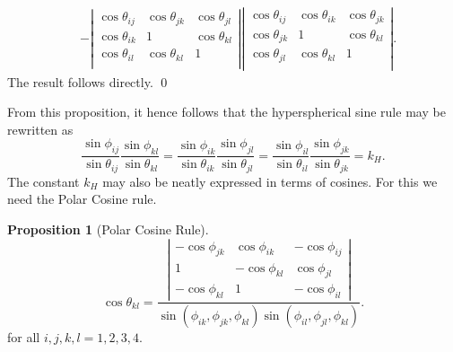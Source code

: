 \documentclass[fleqn,11pt,twoside]{article}
\makeatletter
\renewenvironment{proof}[1][\proofname]{\par
  \normalfont
  \topsep6\p@\@plus6\p@ \trivlist
  \item[\hskip\labelsep\textbf{%
    #1\@addpunct{.}}]\ignorespaces
}{%
  \qed\endtrivlist
}
\theoremstyle{definition}
\newtheorem{prop}{Proposition}
\makeatother
\begin{document}
\begin{proof}
\begin{equation}
\begin{split}
&-\left|\begin{array}{ccc}
\cos\theta_{ij} &  \cos\theta_{jk} & \cos\theta_{jl}\\
\cos\theta_{ik}  & 1 & \cos\theta_{kl}\\
\cos\theta_{il}  & \cos\theta_{kl} & 1\\
\end{array}\right|\left|\begin{array}{ccc}
\cos\theta_{ij} & \cos\theta_{ik} & \cos\theta_{jk}\\
\cos\theta_{jk} & 1 & \cos\theta_{kl}\\
\cos\theta_{jl} & \cos\theta_{kl} & 1\\
\end{array}\right|.
\end{split}
\end{equation}
The result follows directly. 
\end{proof}

From this proposition, it hence follows that the hyperspherical sine rule may be rewritten as 
\begin{equation}
\frac{\sin\phi_{ij}}{\sin\theta_{ij}}\frac{\sin\phi_{kl}}{\sin\theta_{kl}}
=\frac{\sin\phi_{ik}}{\sin\theta_{ik}}\frac{\sin\phi_{jl}}{\sin\theta_{jl}}
=\frac{\sin\phi_{il}}{\sin\theta_{il}}\frac{\sin\phi_{jk}}{\sin\theta_{jk}}
=k_H.
\end{equation}
The constant $k_H$ may also be neatly expressed in terms of cosines.\cite{Derevnin} For this we need the Polar Cosine rule.

\begin{prop}[Polar Cosine Rule]
\begin{equation}
\cos\theta_{kl}=\frac{\left|\begin{array}{ccc}
-\cos\phi_{jk} &
\cos\phi_{ik} &
-\cos\phi_{ij} \\
1 &
-\cos\phi_{kl} &
\cos\phi_{jl} \\
-\cos\phi_{kl} &
1 &
-\cos\phi_{il} 
\end{array}\right|}
{\sin(\phi_{ik},\phi_{jk},\phi_{kl})\sin(\phi_{il},\phi_{jl},\phi_{kl})}.
\end{equation}for all $i,j,k,l=1,2,3,4$.
\end{prop}
\end{document}
